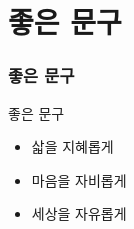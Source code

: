 \documentclass[aspectratio=1610,20pt,xcolor=pdftex,dvipsnames,table,handout]{beamer}
\begin{document}
		\begin{frame} [t,plain]
		\end{frame}						
		\begin{frame} [t,plain]
		\end{frame}						



		\section{좋은 문구}

		\begin{frame} [t,plain]
		\frametitle{좋은 문구}
			\begin{block} {좋은 문구}
			\setlength{\leftmargini}{2em}			
			\begin{itemize}
				\item 삷을 지혜롭게
				\item 마음을 자비롭게
				\item 세상을 자유롭게

			\end{itemize}
			\end{block}						
		\end{frame}						


		\begin{frame} [t,plain]
		\end{frame}						
		\begin{frame} [t,plain]
		\end{frame}						
		\begin{frame} [t,plain]
		\end{frame}						


\end{document}
